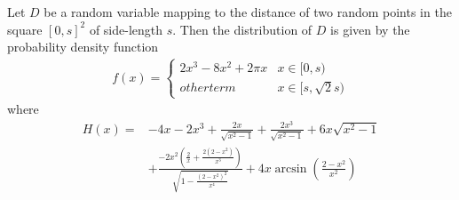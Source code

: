 \begin{theorem} \label{lemma:distance_unit_square}
  Let $D$ be a random variable mapping to the distance of
  two random points in the square $[0,s]^2$ of side-length $s$. Then the
  distribution of $D$ is given by the probability density function
  \begin{align}\label{eq:distance_unit_square}
    f(x) = \begin{cases} 2x^3 -8x^2 + 2\pi x & x \in [0,s) \\ %
                         other term         &  x \in [s,\sqrt{2}s) %
           \end{cases}%
  \end{align}
  where
  \begin{align*}
    H(x) = & - 4x -2x^3 + \frac{2x}{\sqrt{x^2-1}} + \frac{2 x^3}{\sqrt{x^2-1}} + 
 6x \sqrt{x^2-1} \\
           & + \frac{-2 x^2 \left(\frac{2}{x} + \frac{2 (2 - x^2)}{x^3}\right)}{\sqrt{
 1 - \frac{(2 - x^2)^2}{x^4}}} + 4 x \operatorname{arcsin}\left(\frac{2 -
x^2}{x^2}\right)
  \end{align*}
\end{theorem}
%
